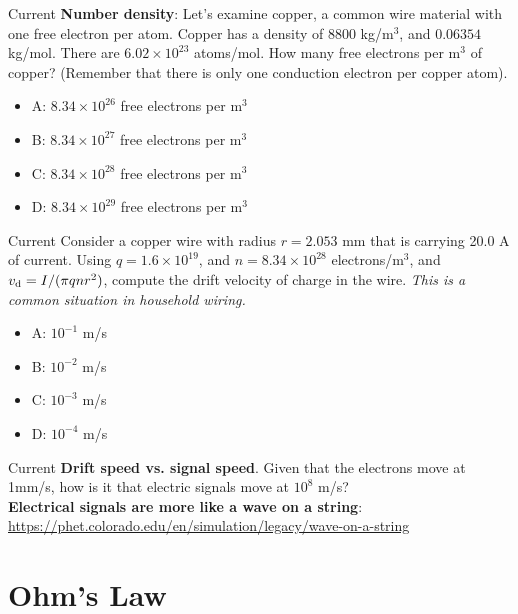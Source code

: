 \documentclass{beamer}
\begin{document}
\begin{frame}{Current}
\textbf{Number density}: Let's examine copper, a common wire material with one free electron per atom.  Copper has a density of 8800 kg/m$^3$, and $0.06354$ kg/mol.  There are $6.02 \times 10^{23}$ atoms/mol.  How many free electrons per m$^3$ of copper? (Remember that there is only one conduction electron per copper atom).
\begin{itemize}
\item A: $8.34 \times 10^{26}$ free electrons per m$^3$
\item B: $8.34 \times 10^{27}$ free electrons per m$^3$
\item C: $8.34 \times 10^{28}$ free electrons per m$^3$
\item D: $8.34 \times 10^{29}$ free electrons per m$^3$
\end{itemize}
\end{frame}

\begin{frame}{Current}
Consider a copper wire with radius $r = 2.053$ mm that is carrying 20.0 A of current.  Using $q = 1.6\times 10^{19}$, and $n = 8.34 \times 10^{28}$ electrons/m$^3$, and $v_{\rm d} = I/(\pi q n r^2)$, compute the drift velocity of charge in the wire.  \textit{This is a common situation in household wiring.}
\begin{itemize}
\item A: $10^{-1}$ m/s
\item B: $10^{-2}$ m/s
\item C: $10^{-3}$ m/s
\item D: $10^{-4}$ m/s
\end{itemize}
\end{frame}

\begin{frame}{Current}
\textbf{Drift speed vs. signal speed}.  Given that the electrons move at 1mm/s, how is it that electric signals move at $10^8$ m/s? \\ \vspace{1cm}
\textbf{Electrical signals are more like a \alert{wave on a string}}: \\ \url{https://phet.colorado.edu/en/simulation/legacy/wave-on-a-string}
\end{frame}

\section{Ohm's Law}
\end{document}
